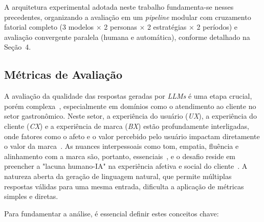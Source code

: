 \documentclass[12pt, a4paper]{article}
\numberwithin{equation}{section}
\begin{document}
A arquitetura experimental adotada neste trabalho fundamenta-se nesses precedentes, organizando a avaliação em um \textit{pipeline} modular com cruzamento fatorial completo (3 modelos $\times$ 2 personas $\times$ 2 estratégias $\times$ 2 períodos) e avaliação convergente paralela (humana e automática), conforme detalhado na Seção~4.

\subsection{Métricas de Avaliação}
\label{subsec:metricas_avaliacao_ft}

A avaliação da qualidade das respostas geradas por \textit{LLMs} é uma etapa crucial, porém complexa~\cite{crolic2023Blame}, especialmente em domínios como o atendimento ao cliente no setor gastronômico. Neste setor, a experiência do usuário (\textit{UX}), a experiência do cliente (\textit{CX}) e a experiência de marca (\textit{BX}) estão profundamente interligadas, onde fatores como o afeto e o valor percebido pelo usuário impactam diretamente o valor da marca~\cite{lee2018Structural}. As nuances interpessoais como tom, empatia, fluência e alinhamento com a marca são, portanto, essenciais~\cite{celikyilmaz2021Evaluation}, e o desafio reside em preencher a "lacuna humano-IA" na experiência afetiva e social do cliente~\cite{LiuThompkins2022Artificial}. A natureza aberta da geração de linguagem natural, que permite múltiplas respostas válidas para uma mesma entrada, dificulta a aplicação de métricas simples e diretas.

Para fundamentar a análise, é essencial definir estes conceitos chave:
\end{document}

